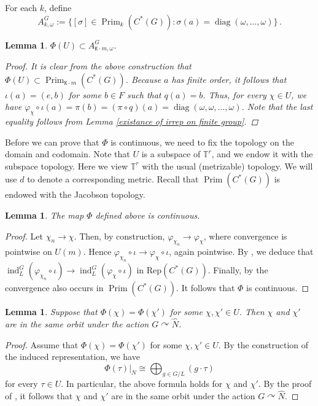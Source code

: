 \documentclass{amsart}
\newcommand{\Rep}{\mathrm{Rep}}
\newtheorem{lemma}[theorem]{Lemma}
\theoremstyle{definition}
\newcommand{\TT}{\mathbb{T}}
\DeclareMathOperator{\diag}{diag}
\DeclareMathOperator{\Prim}{Prim}
\DeclareMathOperator{\ind}{ind}
\newcommand{\mt}{\mathtt}
\begin{document}
For each $k$, define \begin{equation}\label{11}
  A_{k,\omega}^G:=\{[\sigma]\in \Prim_k(C^*(G)): \sigma(a)=\diag(\omega,...,\omega)\} \,. 
\end{equation} \par




\begin{lemma}\label{image of Phi}
    $\Phi(U)\subset A_{\mt{K}\cdot m, \omega}^G$.
    \begin{proof}
        It is clear from the above construction that $\Phi(U)\subset \Prim_{\mt{K}\cdot m}(C^*(G))$. Because $a$ has finite order, it follows that $\iota(a)=(e,b)$ for some $b\in F$ such that $q(a)=b$. Thus, for every $\chi\in U$, we have $\varphi_{\chi}\circ \iota(a)=\pi(b)=(\pi\circ q)(a)=\diag(\omega,\omega,...,\omega)$. Note that the last equality follows from Lemma \ref{existance of irrep on finite group}. 
    \end{proof}
\end{lemma}
Before we can prove that $\Phi$ is continuous, we need to fix the topology on the domain and codomain. Note that $U$ is a subspace of $\TT^r$, and we endow it with the subspace topology. Here we view $\TT^r$ with the usual (metrizable) topology. We will use $d$ to denote a corresponding metric. Recall that $\Prim(C^*(G))$ is endowed with the Jacobson topology.
\begin{lemma}\label{continuity of Phi}
The map $\Phi$ defined above is continuous.
\end{lemma}
\begin{proof}
Let $\chi_n\to \chi$. Then, by construction, $\varphi_{\chi_n}\to \varphi_{\chi}$, where convergence is pointwise on $U(m)$. Hence $\varphi_{\chi_n}\circ \iota \to \varphi_{\chi}\circ \iota$, again pointwise. By \cite[Lemma 4.22]{CW24}, we deduce that $\ind_L^G(\varphi_{\chi_n}\circ\iota)\to \ind_L^G(\varphi_\chi\circ\iota)$ in $\Rep(C^*(G))$. Finally, by  \cite[3.5.8 (p.83)]{Dix77} the convergence also occurs in $\Prim(C^*(G))$. It follows that $\Phi$ is continuous.
\end{proof}
\begin{lemma}\label{intermediate lemma for injectivity}
    Suppose that $\Phi(\chi)=\Phi(\chi')$ for some $\chi,\chi'\in U$. Then $\chi$ and $\chi'$ are in the same orbit under the action $G\curvearrowright \widehat{N}$.
\end{lemma}
\begin{proof}
    Assume that $\Phi(\chi)=\Phi(\chi')$ for some $\chi,\chi'\in U$.
    By the construction of the induced representation, we have
    $$\Phi(\tau)|_{N}\cong\bigoplus_{g\in G/L}(g\cdot\tau)$$ for every $\tau\in U$. In particular, the above formula holds for $\chi$ and $\chi'$. By the proof of \cite[Lemma 4.3]{paper_untwisted_case}, it follows that $\chi$ and $\chi'$ are in the same orbit under the action $G\curvearrowright \widehat{N}$.
\end{proof}
\end{document}
